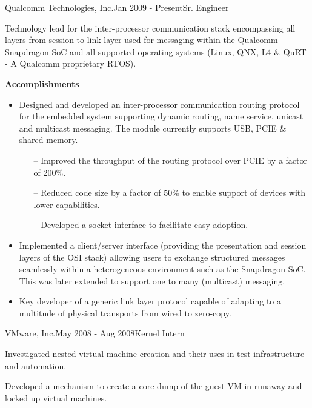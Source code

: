 \begin{rSubsection}{Qualcomm Technologies, Inc.}{Jan 2009 - Present}{Sr. Engineer}{}
  \item[] Technology lead for the inter-processor communication stack encompassing all layers from session to link layer used for messaging within the Qualcomm Snapdragon SoC and all supported operating systems (Linux, QNX, L4 \& QuRT - A Qualcomm proprietary RTOS).
  \item[]
  \item[] \textbf{Accomplishments}
  \begin{itemize}
    \item Designed and developed an inter-processor communication routing protocol for the embedded system supporting dynamic routing, name service, unicast and multicast messaging. The module currently supports USB, PCIE \& shared memory.
    \begin{itemize}
      \item[--] Improved the throughput of the routing protocol over PCIE by a factor of 200\%.
      \item[--] Reduced code size by a factor of 50\% to enable support of devices with lower capabilities.
      \item[--] Developed a socket interface to facilitate easy adoption.
    \end{itemize}
    \item Implemented a client/server interface (providing the presentation and session layers of the OSI stack) allowing users to exchange structured messages seamlessly within a heterogeneous environment such as the Snapdragon SoC. This was later extended to support one to many (multicast) messaging.
    \item Key developer of a generic link layer protocol capable of adapting to a multitude of physical transports from wired to zero-copy.
  \end{itemize}
\end{rSubsection}


\begin{rSubsection}{VMware, Inc.}{May 2008 - Aug 2008}{Kernel Intern}{}
  \item[] Investigated nested virtual machine creation and their uses in test infrastructure and automation.
  \item[] Developed a mechanism to create a core dump of the guest VM in runaway and locked up virtual machines.
\end{rSubsection}


